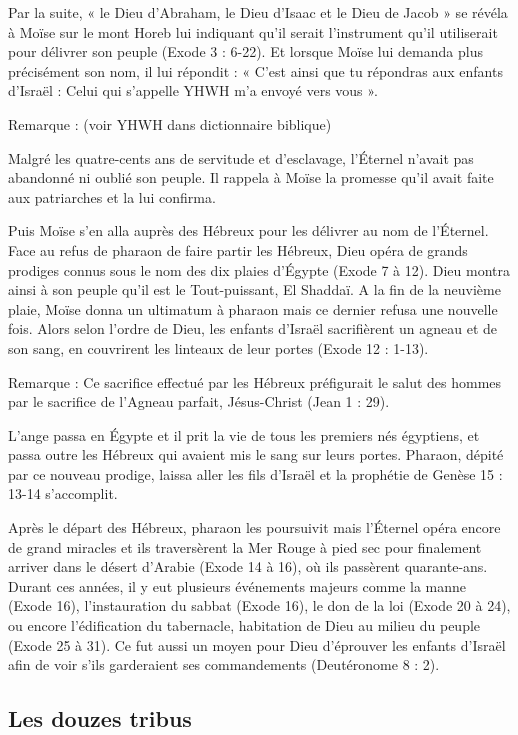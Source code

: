 Par la suite, « le Dieu d'Abraham, le Dieu d'Isaac et le Dieu de Jacob » se révéla à Moïse sur le mont Horeb lui indiquant qu'il serait l'instrument qu'il utiliserait pour délivrer son peuple (Exode 3 : 6-22). Et lorsque Moïse lui demanda plus précisément son nom, il lui répondit : « C'est ainsi que tu répondras aux enfants d'Israël : Celui qui s'appelle YHWH m'a envoyé vers vous ».

Remarque : (voir YHWH dans dictionnaire biblique)

Malgré les quatre-cents ans de servitude et d'esclavage, l’Éternel n'avait pas abandonné ni oublié son peuple. Il rappela à Moïse la promesse qu'il avait faite aux patriarches et la lui confirma.

Puis Moïse s'en alla auprès des Hébreux pour les délivrer au nom de l’Éternel. Face au refus de pharaon de faire partir les Hébreux, Dieu opéra de grands prodiges connus sous le nom des dix plaies d’Égypte (Exode 7 à 12). Dieu montra ainsi à son peuple qu'il est le Tout-puissant, El Shaddaï. A la fin de la neuvième plaie, Moïse donna un ultimatum à pharaon mais ce dernier refusa une nouvelle fois. Alors selon l'ordre de Dieu, les enfants d'Israël sacrifièrent un agneau et de son sang, en couvrirent les linteaux de leur portes (Exode 12 : 1-13).

Remarque : Ce sacrifice effectué par les Hébreux préfigurait le salut des hommes par le sacrifice de l'Agneau parfait, Jésus-Christ (Jean 1 : 29).

L'ange passa en Égypte et il prit la vie de tous les premiers nés égyptiens, et passa outre les Hébreux qui avaient mis le sang sur leurs portes. Pharaon, dépité par ce nouveau prodige, laissa aller les fils d'Israël et la prophétie de Genèse 15 : 13-14 s'accomplit.

Après le départ des Hébreux, pharaon les poursuivit mais l’Éternel opéra encore de grand miracles et ils traversèrent la Mer Rouge à pied sec pour finalement arriver dans le désert d'Arabie (Exode 14 à 16), où ils passèrent quarante-ans. Durant ces années, il y eut plusieurs événements majeurs comme la manne (Exode 16), l'instauration du sabbat (Exode 16), le don de la loi (Exode 20 à 24), ou encore l'édification du tabernacle, habitation de Dieu au milieu du peuple (Exode 25 à 31). Ce fut aussi un moyen pour Dieu d'éprouver les enfants d'Israël afin de voir s'ils garderaient ses commandements (Deutéronome 8 : 2).

\subsection*{Les douzes tribus}

